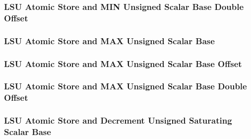 \subsubsection[{\small LSU Atomic Store and MIN Unsigned Scalar Base Double Offset}]{LSU Atomic Store and MIN Unsigned Scalar Base Double Offset} \label{sec:format-LSU-ASMINUSB.D}



\subsubsection[{\small LSU Atomic Store and MAX Unsigned Scalar Base}]{LSU Atomic Store and MAX Unsigned Scalar Base} \label{sec:format-LSU-ASMAXUSB}



\subsubsection[{\small LSU Atomic Store and MAX Unsigned Scalar Base Offset}]{LSU Atomic Store and MAX Unsigned Scalar Base Offset} \label{sec:format-LSU-ASMAXUSB.O}



\subsubsection[{\small LSU Atomic Store and MAX Unsigned Scalar Base Double Offset}]{LSU Atomic Store and MAX Unsigned Scalar Base Double Offset} \label{sec:format-LSU-ASMAXUSB.D}



\subsubsection[{\small LSU Atomic Store and Decrement Unsigned Saturating Scalar Base}]{LSU Atomic Store and Decrement Unsigned Saturating Scalar Base} \label{sec:format-LSU-ASDUSSB}

